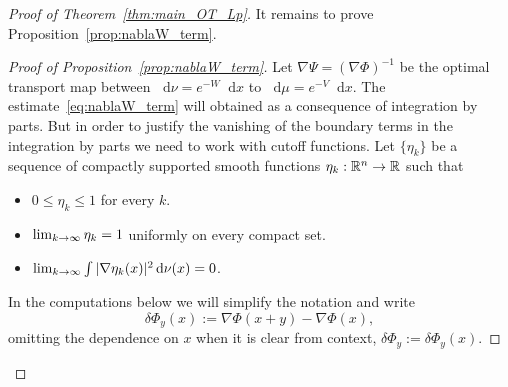 \documentclass[10pt]{amsart}
\theoremstyle{definition}\newtheorem{defi}[theo]{Definition}\newtheorem{rema}[theo]{Remark}\newtheorem{exam}[theo]{Example}\newtheorem{exem}[theo]{Example}\newtheorem{nota}[theo]{Notation}
\newcommand{\R}{\mathbb R}
\newcommand{\V}{V}
\newcommand{\W}{W}
\newcommand{\dd}{n}
\newcommand{\source}{\mu}
\newcommand{\target}{\nu}
\newcommand*\diff{\mathop{}\!\mathrm{d}}
\newcommand{\OT}{\Phi}
\newcommand{\findiff}{\delta\OT}
\renewcommand*{\to}{\mathchoice{\longrightarrow}{\rightarrow}{\rightarrow}{\rightarrow}}
\begin{document}
\begin{proof}[Proof of Theorem~\ref{thm:main_OT_Lp}]
It remains to prove Proposition~\ref{prop:nablaW_term}.
\begin{proof}[Proof of Proposition~\ref{prop:nablaW_term}]
Let $\nabla\Psi=(\nabla \OT)^{-1}$ be the optimal transport map between $\diff \target=e^{-\W}\diff x$ to $\diff \source=e^{-\V}\diff x$. The estimate~\eqref{eq:nablaW_term} will obtained as a consequence of integration by parts. But in order to justify the vanishing of the boundary terms in the integration by parts we need to work with cutoff functions. Let $\{\eta_k\}$ be a sequence of compactly supported smooth functions $\eta_k:\R^{\dd}\to \R$ such that
\begin{itemize}
\item $0\le \eta_k\le 1$ for every $k$.
\item $\lim_{k\to\infty}\eta_k=1$ uniformly on every compact set.
\item $\lim_{k\to\infty}\int |\nabla\eta_k(x)|^2 \diff\target(x)=0$.
\end{itemize}
In the computations below we will simplify the notation and write
\[
\findiff_y(x):=\nabla \OT(x+y)-\nabla \OT(x),
\]
omitting the dependence on $x$ when it is clear from context, $\findiff_y:=\findiff_y(x)$.


\end{proof}
\end{proof}
\end{document}

